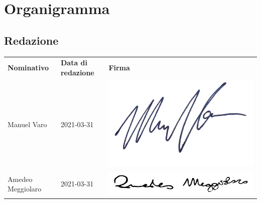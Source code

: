 \section{Organigramma}
    \subsection{Redazione}
        \begin{center}
            \begin{table}[h!]
                \centering
                \renewcommand{\arraystretch}{1.8}
                \begin{tabular}{p{150px} p{110px} p{110px}}
                    \rowcolor{logo!70} \textbf{Nominativo} & \textbf{Data di redazione} & \textbf{Firma}\\
                    Manuel Varo & 2021-03-31 & \includegraphics[scale=0.03]{../../../Images/firme/firmaManuelVaro.png} \\
                    Amedeo Meggiolaro & 2021-03-31 & \includegraphics[scale=0.05]{../../../Images/firme/firmaAmedeoMeggiolaro.png} \\
                \end{tabular}
            \end{table}
        \end{center}
